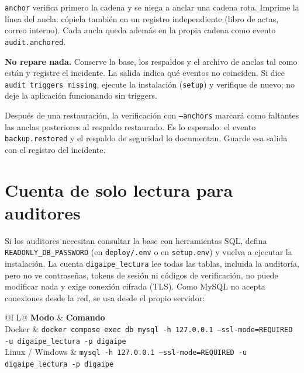 \texttt{anchor} verifica primero la cadena y se niega a anclar una cadena rota. Imprime la línea
del ancla: cópiela también en un registro independiente (libro de actas, correo interno). Cada
ancla queda además en la propia cadena como evento \texttt{audit.anchored}.

\begin{aviso}
	\textbf{No repare nada.} Conserve la base, los respaldos y el archivo de anclas tal como están
	y registre el incidente. La salida indica qué eventos no coinciden. Si dice
	\texttt{audit triggers missing}, ejecute la instalación (\texttt{setup}) y verifique de nuevo;
	no deje la aplicación funcionando sin triggers.
\end{aviso}

Después de una restauración, la verificación con \texttt{--anchors} marcará como faltantes las
anclas posteriores al respaldo restaurado. Es lo esperado: el evento \texttt{backup.restored} y el
respaldo de seguridad lo documentan. Guarde esa salida con el registro del incidente.

\section{Cuenta de solo lectura para auditores}

Si los auditores necesitan consultar la base con herramientas SQL, defina
\texttt{READONLY\_DB\_PASSWORD} (en \texttt{deploy/.env} o en \texttt{setup.env}) y vuelva a
ejecutar la instalación. La cuenta \texttt{digaipe\_lectura} lee todas las tablas, incluida la
auditoría, pero no ve contraseñas, tokens de sesión ni códigos de verificación, no puede
modificar nada y exige conexión cifrada (TLS). Como MySQL no acepta conexiones desde la red, se
usa desde el propio servidor:

\begin{xltabular}{\linewidth}{@{}l L@{}}
	\toprule
	\textbf{Modo} & \textbf{Comando} \\
	\midrule
	\endhead
	Docker & \texttt{docker compose exec db mysql -h 127.0.0.1 --ssl-mode=REQUIRED -u
	digaipe\_lectura -p digaipe} \\
	Linux / Windows & \texttt{mysql -h 127.0.0.1 --ssl-mode=REQUIRED -u digaipe\_lectura -p
	digaipe} \\
	\bottomrule
\end{xltabular}
